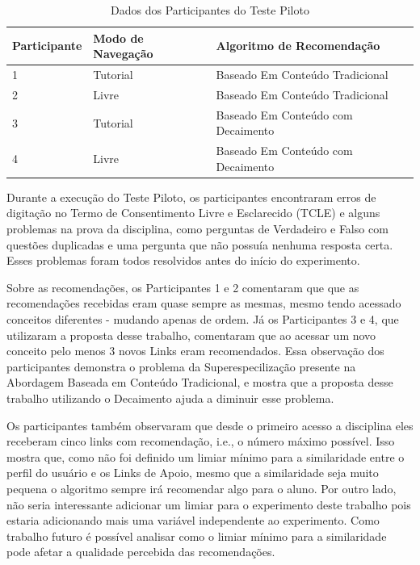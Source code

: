 \begin{table}[h]
\footnotesize
\caption[Dados dos Participantes do Teste Piloto]{Dados dos Participantes do Teste Piloto}
\label{tab:participantes-teste-piloto}
\centering
\begin{tabular}{|p{2cm}|p{3.5cm}|p{6.5cm}|}
  \hline
  \textbf{Participante} & \textbf{Modo de Navegação} & \textbf{Algoritmo de Recomendação} \\
  \hline
  1 & Tutorial & Baseado Em Conteúdo Tradicional \\
  \hline
  2 & Livre & Baseado Em Conteúdo Tradicional \\
  \hline
  3 & Tutorial & Baseado Em Conteúdo com Decaimento \\
  \hline
  4 & Livre & Baseado Em Conteúdo com Decaimento \\
  \hline
\end{tabular}
\end{table}

Durante a execução do Teste Piloto, os participantes encontraram erros de digitação no Termo de Consentimento Livre e Esclarecido (TCLE)
e alguns problemas na prova da disciplina, como perguntas de Verdadeiro e Falso com questões duplicadas e uma
pergunta que não possuía nenhuma resposta certa. Esses problemas foram todos resolvidos antes do início do experimento.

Sobre as recomendações, os Participantes 1 e 2 comentaram que que as recomendações recebidas eram quase sempre as mesmas,
mesmo tendo acessado conceitos diferentes - mudando apenas de ordem. Já os Participantes
3 e 4, que utilizaram a proposta desse trabalho, comentaram que ao acessar um novo conceito pelo menos 3 novos Links eram
recomendados. Essa observação dos participantes demonstra o problema da Superespecilização presente na Abordagem Baseada
em Conteúdo Tradicional, e mostra que a proposta desse trabalho utilizando o Decaimento ajuda a diminuir esse problema.

Os participantes também observaram que desde o primeiro acesso a disciplina eles receberam cinco links com recomendação, i.e.,
o número máximo possível. Isso mostra que, como não foi definido um limiar mínimo para a similaridade entre o perfil do usuário
e os Links de Apoio, mesmo que a similaridade seja muito pequena o algoritmo sempre irá recomendar algo para o aluno. Por
outro lado, não seria interessante adicionar um limiar para o experimento deste trabalho pois estaria adicionando
mais uma variável independente ao experimento. Como trabalho futuro é possível analisar como o limiar mínimo para a
similaridade pode afetar a qualidade percebida das recomendações.

